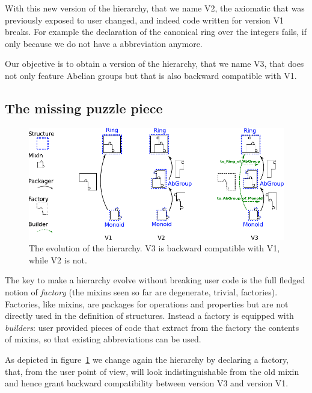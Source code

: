 \documentclass[a4paper,UKenglish,cleveref, autoref]{lipics-v2019}
\newcommand{\mixin}{mixin}
\newcommand{\mixins}{mixins}
\newcommand{\factory}{factory}
\newcommand{\factories}{factories}
\newcommand{\Factories}{Factories}
\newcommand{\phantterm}{abbreviation}
\newcommand{\builder}{builder}
\theoremstyle{implem}
\theoremstyle{implem}
\theoremstyle{command}
\begin{document}
With this new version of the hierarchy, that we name V2, the axiomatic that
was previously exposed to user changed, and indeed
code written for version V1 breaks. For example the declaration of the
canonical ring over the integers fails, if only
because we do not have a  \phantterm{}
anymore.

Our objective is to obtain a version of the hierarchy, that we name V3, that does
not only feature Abelian groups but that is also backward compatible
with V1.

\subsection{The missing puzzle piece}\label{subsec:v3}

\begin{figure}[!h]
  \begin{center}
    \includegraphics[width=\textwidth]{puzzle.pdf}
  \end{center}
  \caption{\label{fig:puzzle}The evolution of the hierarchy. V3 is backward compatible with V1, while V2 is not.}
\end{figure}

The key to make a hierarchy evolve without breaking user code is the full
fledged notion of \emph{\factory{}} (the \mixins{} seen so far are degenerate,
trivial, \factories{}).
\Factories{}, like \mixins{}, are packages for operations and properties but are
not directly used in the definition of structures. Instead a \factory{} is
equipped with \emph{\builder{}s}: user provided pieces of code that extract
from the \factory{} the contents of \mixins{}, so that existing
\phantterm{}s can be used.

As depicted in figure~\ref{fig:puzzle} we change again the hierarchy
by declaring a  \factory{}, that, from the user point of view,
will look indistinguishable from the old  \mixin{}
and hence grant backward compatibility between version V3 and version V1.
\end{document}
